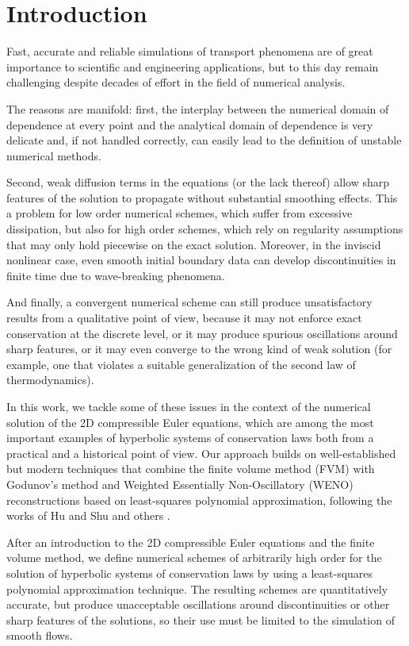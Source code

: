 \chapter*{Introduction} \label{ch:introduction}
{}

Fast, accurate and reliable simulations of transport phenomena are of great
importance to scientific and engineering applications, but to this day remain
challenging despite decades of effort in the field of numerical analysis.

The reasons are manifold: first, the interplay between the numerical domain
of dependence at every point and the analytical domain of dependence is very
delicate and, if not handled correctly, can easily lead to the definition
of unstable numerical methods.

Second, weak diffusion terms in the equations (or the lack thereof) allow
sharp features of the solution to propagate without substantial smoothing
effects. This a problem for low order numerical schemes, which suffer from
excessive dissipation, but also for high order schemes, which rely on regularity
assumptions that may only hold piecewise on the exact solution.
Moreover, in the inviscid nonlinear case, even smooth initial boundary
data can develop discontinuities in finite time due to wave-breaking phenomena.

And finally, a convergent numerical scheme can still produce unsatisfactory results
from a qualitative point of view, because it may not enforce exact
conservation at the discrete level, or it may produce spurious oscillations
around sharp features, or it may even converge to the wrong kind of weak
solution (for example, one that violates a suitable generalization of the
second law of thermodynamics).

In this work, we tackle some of these issues in the context of the
numerical solution of the 2D compressible Euler equations,
which are among the most important examples of hyperbolic systems of
conservation laws both from a practical and a historical point of view.
Our approach builds on well-established but modern techniques that
combine the finite volume method (FVM) with Godunov’s method and Weighted
Essentially Non-Oscillatory (WENO) reconstructions based on least-squares
polynomial approximation, following the works of Hu and Shu and others
\cite{hu1999weighted} \cite{kaser2005ader}.

After an introduction to the 2D compressible Euler equations
and the finite volume method, we define numerical schemes
of arbitrarily high order for the solution of hyperbolic systems
of conservation laws by using a least-squares polynomial approximation
technique. The resulting schemes are quantitatively accurate, but
produce unacceptable oscillations around discontinuities or other sharp
features of the solutions, so their use must be limited to the simulation
of smooth flows.

